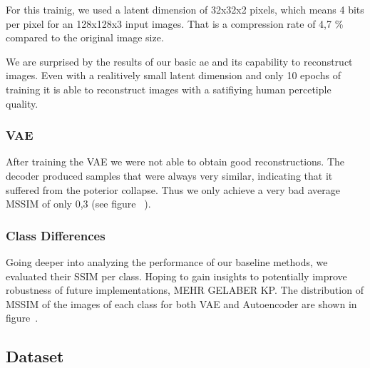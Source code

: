        For this trainig, we used a latent dimension of 32x32x2 pixels, which means 4 bits per pixel for an 128x128x3 input images. That is a compression rate of 4,7 \% compared to the original image size.

        We are surprised by the results of our basic \ac{ae} and its capability to reconstruct images. Even with a realitively small latent dimension and only 10 epochs of training it is able to reconstruct images with a satifiying human percetiple quality.
    
    \subsubsection{VAE}\label{subsubsec:vae_training}
        After training the VAE we were not able to obtain good reconstructions.
        The decoder produced samples that were always very similar, indicating that it suffered from the poterior collapse.
        Thus we only achieve a very bad average MSSIM of only 0,3 (see figure ~\cite{citationNeeded}).
        

    \subsubsection{Class Differences}\label{subsubsec:class-differences}
        Going deeper into analyzing the performance of our baseline methods, we evaluated their SSIM per class.
        Hoping to gain insights to potentially improve robustness of future implementations, MEHR GELABER KP.
        The distribution of MSSIM of the images of each class for both VAE and Autoencoder are shown in figure~\cite{citationNeeded}.
        


\subsection{Dataset}\label{subsec:dataset}

